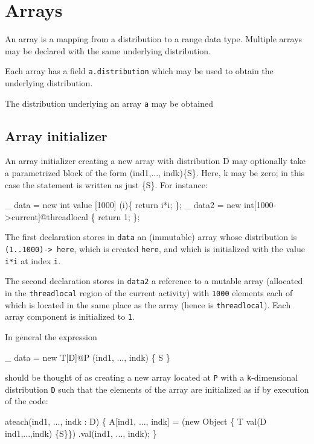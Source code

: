\chapter{Arrays}\label{XtenArrays}

An array is a mapping from a distribution to a range data
type. Multiple arrays may be declared with the same underlying
distribution. 

Each array has a field {\tt a.distribution} which may be used to
obtain the underlying distribution.

The distribution underlying an array {\tt a} may be obtained 



\section{Array initializer}\label{ArrayInitializer}\label{array!creation}
An array initializer creating a new array with distribution {\cf D} may
optionally take a parametrized block of the form {\cf (ind1,...,
indk)\{S\}}. Here, {\cf k} may be zero; in this case the statement is written
as just {\cf \{S\}}. For instance:
\begin{x10}
\_ data = new int value [1000] 
    (i)\{ return i*i; \};
\_ data2 = new int[1000->current]@threadlocal 
    \{ return 1; \};
\end{x10}

{}\noindent The first declaration stores in {\tt data} an (immutable)
array whose distribution is {\tt (1..1000)-> here}, which is created
{\tt here}, and which is initialized with the value {\tt i*i} at index
{\tt i}. 

The second declaration stores in {\tt data2} a reference to a mutable
array (allocated in the {\tt threadlocal} region of the current
activity) with {\tt 1000} elements each of which is located in the
same place as the array (hence is {\tt threadlocal}). Each array
component is initialized to {\tt 1}.


In general the expression
\begin{x10}
    \_ data =  new T[D]@P (ind1, ..., indk) \{ S \}
\end{x10}

\noindent should be thought of as creating a new array located at {\tt P} with a {\tt k}-dimensional distribution {\tt D} such that the elements of 
the array are initialized as if by execution of the code:

\begin{x10}
   ateach(ind1, ..., indk : D) \{
       A[ind1, ..., indk] = 
     (new Object \{ T val(D ind1,...,indk) \{S\}\})
     .val(ind1, ..., indk);
   \}
\end{x10}

